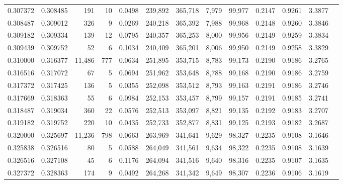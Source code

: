 \begin{tabular}{rrrrrrrrrrrrr}
0.307372 & 0.308485 &    191 &    10 &                                     0.0498 & 239,892 & 365,718 &   7,979 &  99,977 & 0.2147 & 0.9261 & 3.3877 \\
0.308487 & 0.309012 &    326 &     9 &                                     0.0269 & 240,218 & 365,392 &   7,988 &  99,968 & 0.2148 & 0.9260 & 3.3846 \\
0.309182 & 0.309334 &    139 &    12 &                                     0.0795 & 240,357 & 365,253 &   8,000 &  99,956 & 0.2149 & 0.9259 & 3.3834 \\
0.309439 & 0.309752 &     52 &     6 &                                     0.1034 & 240,409 & 365,201 &   8,006 &  99,950 & 0.2149 & 0.9258 & 3.3829 \\
0.310000 & 0.316377 & 11,486 &   777 &                                     0.0634 & 251,895 & 353,715 &   8,783 &  99,173 & 0.2190 & 0.9186 & 3.2765 \\
0.316516 & 0.317072 &     67 &     5 &                                     0.0694 & 251,962 & 353,648 &   8,788 &  99,168 & 0.2190 & 0.9186 & 3.2759 \\
0.317372 & 0.317425 &    136 &     5 &                                     0.0355 & 252,098 & 353,512 &   8,793 &  99,163 & 0.2191 & 0.9186 & 3.2746 \\
0.317669 & 0.318363 &     55 &     6 &                                     0.0984 & 252,153 & 353,457 &   8,799 &  99,157 & 0.2191 & 0.9185 & 3.2741 \\
0.318487 & 0.319034 &    360 &    22 &                                     0.0576 & 252,513 & 353,097 &   8,821 &  99,135 & 0.2192 & 0.9183 & 3.2707 \\
0.319182 & 0.319752 &    220 &    10 &                                     0.0435 & 252,733 & 352,877 &   8,831 &  99,125 & 0.2193 & 0.9182 & 3.2687 \\
0.320000 & 0.325697 & 11,236 &   798 &                                     0.0663 & 263,969 & 341,641 &   9,629 &  98,327 & 0.2235 & 0.9108 & 3.1646 \\
0.325838 & 0.326516 &     80 &     5 &                                     0.0588 & 264,049 & 341,561 &   9,634 &  98,322 & 0.2235 & 0.9108 & 3.1639 \\
0.326516 & 0.327108 &     45 &     6 &                                     0.1176 & 264,094 & 341,516 &   9,640 &  98,316 & 0.2235 & 0.9107 & 3.1635 \\
0.327372 & 0.328363 &    174 &     9 &                                     0.0492 & 264,268 & 341,342 &   9,649 &  98,307 & 0.2236 & 0.9106 & 3.1619 \\

\end{tabular}
